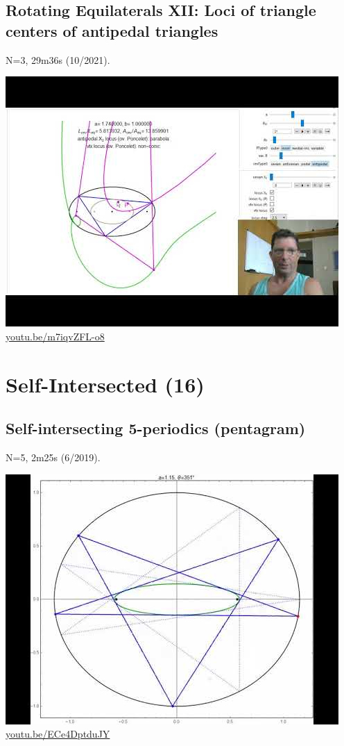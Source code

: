\documentclass[12pt]{amsart}
\begin{document}
\subsection{Rotating Equilaterals XII: Loci of triangle centers of antipedal triangles}
\label{vid:m7iqvZFL-o8}
\noindent N=3, 29m36s (10/2021). 
\begin{center}\includegraphics[width=.5\textwidth]{pics/m7iqvZFL-o8.jpg} \\ 
\href{https://youtu.be/m7iqvZFL-o8}{\url{youtu.be/m7iqvZFL-o8}}\end{center}
% 


\section{Self-Intersected (16)}

\subsection{Self-intersecting 5-periodics (pentagram)}
\label{vid:ECe4DptduJY}
\noindent N=5, 2m25s (6/2019). 
\begin{center}\includegraphics[width=.5\textwidth]{pics/ECe4DptduJY.jpg} \\ 
\href{https://youtu.be/ECe4DptduJY}{\url{youtu.be/ECe4DptduJY}}\end{center}
% 
\end{document}

